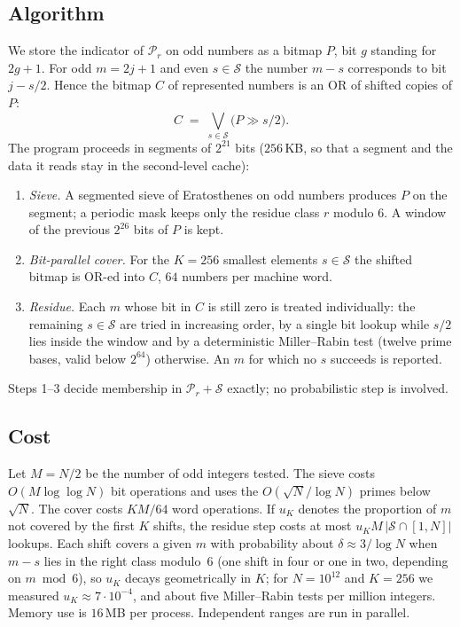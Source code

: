 \documentclass[11pt]{article}
\theoremstyle{definition}
\theoremstyle{remark}
\begin{document}
\subsection{Algorithm}
We store the indicator of $\mathcal P_r$ on odd numbers as a bitmap $P$, bit $g$ standing for $2g+1$.
For odd $m=2j+1$ and even $s\in\mathcal S$ the number $m-s$ corresponds to bit $j-s/2$. Hence the
bitmap $C$ of represented numbers is an OR of shifted copies of $P$:
\[
   C \;=\; \bigvee_{s\in\mathcal S} \bigl(P \gg s/2\bigr).
\]
The program proceeds in segments of $2^{21}$ bits ($256$\,KB, so that a segment and the data it
reads stay in the second-level cache):
\begin{enumerate}
\item \emph{Sieve.} A segmented sieve of Eratosthenes on odd numbers produces $P$ on the segment;
a periodic mask keeps only the residue class $r$ modulo $6$. A window of the previous $2^{26}$ bits of
$P$ is kept.
\item \emph{Bit-parallel cover.} For the $K=256$ smallest elements $s\in\mathcal S$ the shifted
bitmap is OR-ed into $C$, $64$ numbers per machine word.
\item \emph{Residue.} Each $m$ whose bit in $C$ is still zero is treated individually: the
remaining $s\in\mathcal S$ are tried in increasing order, by a single bit lookup while $s/2$ lies inside the
window and by a deterministic Miller--Rabin test (twelve prime bases, valid below $2^{64}$) otherwise.
An $m$ for which no $s$ succeeds is reported.
\end{enumerate}
Steps 1--3 decide membership in $\mathcal P_r+\mathcal S$ exactly; no probabilistic step is involved.

\subsection{Cost}
Let $M=N/2$ be the number of odd integers tested. The sieve costs $O(M\log\log N)$ bit operations
and uses the $O(\sqrt N/\log N)$ primes below $\sqrt N$. The cover costs $KM/64$ word operations.
If $u_K$ denotes the proportion of $m$ not covered by the first $K$ shifts, the residue step costs
at most $u_K M\,|\mathcal S\cap[1,N]|$ lookups. Each shift covers a given $m$ with probability about
$\delta\approx 3/\log N$ when $m-s$ lies in the right class modulo~$6$ (one shift in four or one in
two, depending on $m \bmod 6$), so $u_K$ decays geometrically in $K$; for $N=10^{12}$ and $K=256$
we measured $u_K\approx 7\cdot 10^{-4}$, and about five Miller--Rabin tests per million integers.
Memory use is $16$\,MB per process. Independent ranges are run in parallel.
\end{document}

